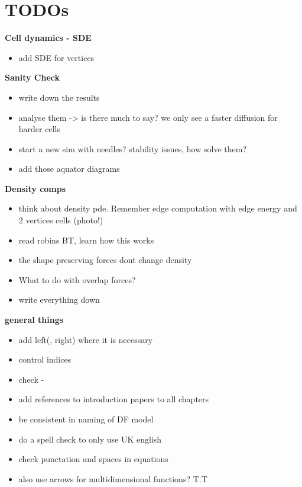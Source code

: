 \section{TODOs}

\textbf{Cell dynamics - SDE}
\begin{itemize}
    \item add SDE for vertices
\end{itemize}


\textbf{Sanity Check}
\begin{itemize}
    \item write down the results 
    \item analyse them -> is there much to say? we only see a faster diffusion for harder cells 
    \item start a new sim with needles? stability issues, how solve them? 
    \item add those aquator diagrams 
\end{itemize}

\textbf{Density comps}
\begin{itemize}
    \item think about density pde. Remember edge computation with edge energy and 2 vertices cells (photo!)
    \item read robins BT, learn how this works 
    \item the shape preserving forces dont change density 
    \item What to do with overlap forces?  
    \item write everything down      
\end{itemize}

\textbf{general things}
\begin{itemize}
    \item add left(, right) where it is necessary 
    \item control indices 
    \item check - 
    \item add references to introduction papers to all chapters
    \item be consistent in naming of DF model 
    \item do a spell check to only use UK english
    \item check punctation and spaces in equations
    \item also use arrows for multidimensional functions? T.T
\end{itemize}